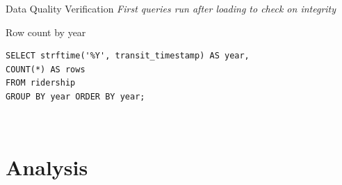 \documentclass{beamer}
\begin{document}
	\begin{frame}[fragile]{Data Quality Verification}
		\centering
		\textit{First queries run after loading to check on integrity}\\
		\vspace{0.15cm}
		\begin{block}{Row count by year}
			\begin{lstlisting}[style=sqlsmall]
SELECT strftime('%Y', transit_timestamp) AS year,
COUNT(*) AS rows
FROM ridership
GROUP BY year ORDER BY year;
			\end{lstlisting}
		\end{block}
		\vspace{0.15cm}
		\\
	\end{frame}
	
	\section{Analysis}
	
\end{document}
